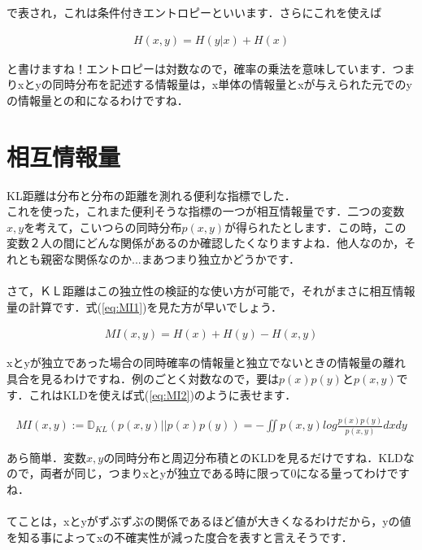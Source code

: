 \documentclass[11pt,a4paper,uplatex]{ujreport}
\begin{document}
で表され，これは条件付きエントロピーといいます\cite{prml}\cite{dist}．さらにこれを使えば

\begin{eqnarray}
\label{eq:cond_entropy2}
H(x,y) = H(y|x) + H(x)
\end{eqnarray}

と書けますね！エントロピーは対数なので，確率の乗法を意味しています．つまりxとyの同時分布を記述する情報量は，x単体の情報量とxが与えられた元でのyの情報量との和になるわけですね．

\section{相互情報量}
KL距離は分布と分布の距離を測れる便利な指標でした．\\

これを使った，これまた便利そうな指標の一つが相互情報量です．二つの変数$x, y$を考えて，こいつらの同時分布$p(x,y)$が得られたとします．この時，この変数２人の間にどんな関係があるのか確認したくなりますよね．他人なのか，それとも親密な関係なのか...まあつまり独立かどうかです．\\
\\

さて，ＫＬ距離はこの独立性の検証的な使い方が可能で，それがまさに相互情報量の計算です．式(\ref{eq:MI1})を見た方が早いでしょう\cite{dist}．

\begin{eqnarray}
\label{eq:MI1}
MI(x,y) = H(x) + H(y) - H(x,y)
\end{eqnarray}

xとyが独立であった場合の同時確率の情報量と独立でないときの情報量の離れ具合を見るわけですね．例のごとく対数なので，要は$p(x)p(y)とp(x,y)$です．これはKLDを使えば式(\ref{eq:MI2})のように表せます．

\begin{eqnarray}
\label{eq:MI2}
  MI(x,y) := \mathbb{D}_{KL}(p(x,y) || p(x)p(y)) = -\iint p(x,y) log \frac{p(x)p(y)}{p(x,y)} dxdy
\end{eqnarray}

あら簡単．$変数x,y$の同時分布と周辺分布積とのKLDを見るだけですね．KLDなので，両者が同じ，つまりxとyが独立である時に限って0になる量ってわけですね．\\
\\

てことは，xとyがずぶずぶの関係であるほど値が大きくなるわけだから，yの値を知る事によってxの不確実性が減った度合を表すと言えそうです\cite{prml}．\\
\\
\end{document}
